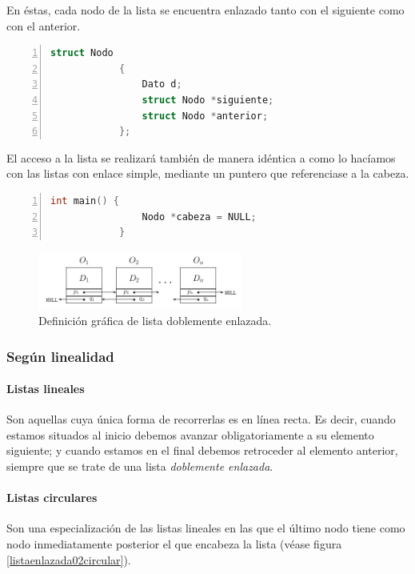 \documentclass[a4paper, 11pt, titlepage]{article}
\begin{document}
            En éstas, cada nodo de la lista se encuentra enlazado tanto con el siguiente como con el anterior.
    
            \begin{lstlisting}[language=C,numbers=left]
            struct Nodo 
            {
                Dato d;
                struct Nodo *siguiente;
                struct Nodo *anterior;
            };\end{lstlisting}
    
            El acceso a la lista se realizará también de manera idéntica a como lo hacíamos con las listas 
            con enlace simple, mediante un puntero que referenciase a la cabeza.
    
            \begin{lstlisting}[language=C,numbers=left]
            int main() {
                Nodo *cabeza = NULL;
            }\end{lstlisting}
    
    
            
            \begin{figure}[htp]
                \centering
                \includegraphics[width=0.6\textwidth]{resources/listaenlazada02.jpg}
                \caption{Definición gráfica de lista doblemente enlazada.}
                \label{listaenlazada02}
            \end{figure}        

        \subsubsection{Según linealidad}

            \paragraph{Listas lineales} Son aquellas cuya única forma de recorrerlas es en
            línea recta. Es decir, cuando estamos situados al inicio debemos avanzar obligatoriamente
            a su elemento siguiente; y cuando estamos en el final debemos retroceder al elemento 
            anterior, siempre que se trate de una lista \textit{doblemente enlazada}.
        
            \paragraph{Listas circulares} Son una especialización de las listas lineales en 
            las que el último nodo tiene como nodo inmediatamente posterior el que encabeza
            la lista (véase figura \ref{listaenlazada02circular}).
\end{document}

